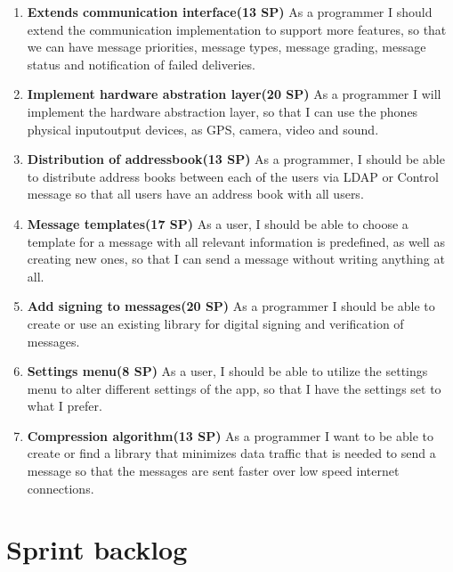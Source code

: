\documentclass[a4paper, norsk, 12pt]{article}
\newcommand{\SP}[1]{(#1 SP)}
\begin{document}
\begin{enumerate}
			\item {\bf Extends communication interface\SP{13}} As a programmer I should extend the communication implementation to support more features, so that we can have message priorities, message types, message grading, message status and notification of failed deliveries.
			\item {\bf Implement hardware abstration layer\SP{20}} As a programmer I will implement the hardware abstraction layer, so that I can use the phones physical input\/output devices, as GPS, camera, video and sound. 
			\item {\bf Distribution of addressbook\SP{13}} As a programmer, I should be able to distribute address books between each of the users via LDAP or Control message so that all users have an address book with all users.
			\item {\bf Message templates\SP{17}} As a user, I should be able to choose a template for a message with all relevant information is predefined, as well as creating new ones, so that I can send a message without writing anything at all.
			\item {\bf Add signing to messages\SP{20}} As a programmer I should be able to create or use an existing library for digital signing and verification of messages.
			\item {\bf Settings menu\SP{8}} As a user, I should be able to utilize the settings menu to alter different settings of the app, so that I have the settings set to what I prefer.
			\item {\bf Compression algorithm\SP{13}} As a programmer I want to be able to create or find a library that minimizes data traffic that is needed to send a message so that the messages are sent faster over low speed internet connections.	
		\end{enumerate}
	\pagebreak
	\section{Sprint backlog}
\end{document}
